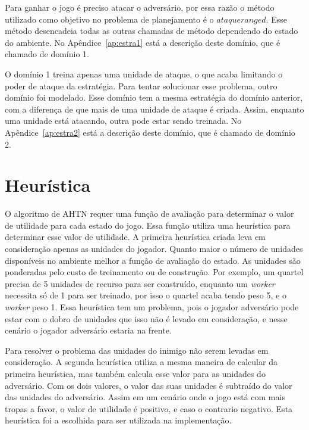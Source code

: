 Para ganhar o jogo é preciso atacar o adversário, por essa razão o método utilizado como objetivo no problema de planejamento é o $ataqueranged$.
Esse método desencadeia todas as outras chamadas de método dependendo do estado do ambiente.
No Apêndice~\ref{ap:estra1} está a descrição deste domínio, que é chamado de domínio 1.

O domínio 1 treina apenas uma unidade de ataque, o que acaba limitando o poder de ataque da estratégia.
Para tentar solucionar esse problema, outro domínio foi modelado.
Esse domínio tem a mesma estratégia do domínio anterior, com a diferença de que mais de uma unidade de ataque é criada.
Assim, enquanto uma unidade está atacando, outra pode estar sendo treinada.
No Apêndice~\ref{ap:estra2} está a descrição deste domínio, que é chamado de domínio 2.


\section{Heurística}

O algoritmo de AHTN requer uma função de avaliação para determinar o valor de utilidade para cada estado do jogo.
Essa função utiliza uma heurística para determinar esse valor de utilidade.
A primeira heurística criada leva em consideração apenas as unidades do jogador.
Quanto maior o número de unidades disponíveis no ambiente melhor a função de avaliação do estado.
As unidades são ponderadas pelo custo de treinamento ou de construção.
Por exemplo, um quartel precisa de 5 unidades de recurso para ser construído, enquanto um \textit{worker} necessita só de 1 para ser treinado, por isso o quartel acaba tendo peso 5, e o \textit{worker} peso 1. 
Essa heurística tem um problema, pois o jogador adversário pode estar com o dobro de unidades que isso não é levado em consideração, e nesse cenário o jogador adversário estaria na frente. 

Para resolver o problema das unidades do inimigo não serem levadas em consideração.
A segunda heurística utiliza a mesma maneira de calcular da primeira heurística, mas também calcula esse valor para as unidades do adversário. 
Com os dois valores, o valor das suas unidades é subtraído do valor das unidades do adversário. 
Assim em um cenário onde o jogo está com mais tropas a favor, o valor de utilidade é positivo, e caso o contrario negativo.
Esta heurística foi a escolhida para ser utilizada na implementação.

